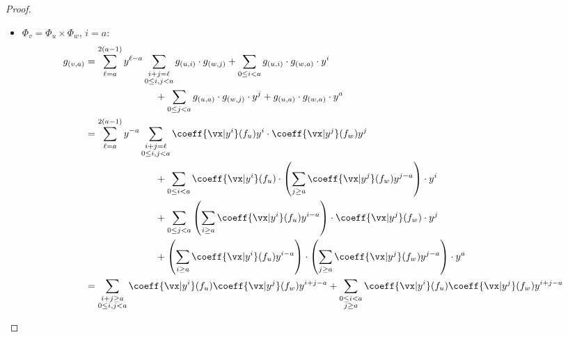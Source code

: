 \documentclass{toc}
\begin{document}
\begin{proof}
\begin{subproof}
\begin{itemize}
\begin{align*}
                                        &=\sum_{0\le j\le i} \coeff{\vx|y^{j}}(f_u) \cdot \coeff{\vx|y^{i-j}}(f_w)\\
                                        &=\coeff{\vx|y^i}(f_u\cdot f_w)
                                        =\coeff{\vx|y^i}(f_v)
                                        \;.
                                \end{align*}
                        \item $\Phi_v=\Phi_u\times\Phi_w$, $i=a$:
                                \begin{align*}
                                        g_{(v,a)}
                                        &=\sum_{\ell=a}^{2(a-1)}y^{\ell-a}\sum_{\substack{i+j=\ell\\0\le i,j< a}}g_{(u,i)}\cdot g_{(w,j)}
                                                + \sum_{0\le i<a} g_{(u,i)}\cdot g_{(w,a)}\cdot y^i\\
                                        &\hspace{1in}+ \sum_{0\le j<a} g_{(u,a)}\cdot g_{(w,j)}\cdot y^j
                                                +g_{(u,a)}\cdot g_{(w,a)}\cdot y^a\\
                                        &=\sum_{\ell=a}^{2(a-1)}y^{-a}\sum_{\substack{i+j=\ell\\0\le i,j< a}}\coeff{\vx|y^i}(f_u)y^i\cdot \coeff{\vx|y^j}(f_w)y^j\\
                                        &\hspace{1in}+ \sum_{0\le i<a} \coeff{\vx|y^i}(f_u)\cdot \left (\sum_{j\ge a}\coeff{\vx|y^j}(f_w)y^{j-a}\right)\cdot y^i\\
                                        &\hspace{1in}+ \sum_{0\le j<a} \left(\sum_{i\ge a}\coeff{\vx|y^i}(f_u)y^{i-a}\right)\cdot \coeff{\vx|y^j}(f_w)\cdot y^j\\
                                        &\hspace{1in}+\left(\sum_{i\ge a}\coeff{\vx|y^i}(f_u)y^{i-a}\right)\cdot \left (\sum_{j\ge a}\coeff{\vx|y^j}(f_w)y^{j-a}\right)\cdot y^a\\
                                        &=\sum_{\substack{i+j\ge a\\0\le i,j<a}}\coeff{\vx|y^i}(f_u)\coeff{\vx|y^j}(f_w) y^{i+j-a}
                                                +\sum_{\substack{0\le i<a\\ j\ge a}}\coeff{\vx|y^i}(f_u)\coeff{\vx|y^j}(f_w) y^{i+j-a}\\

\end{align*}
\end{itemize}
\end{subproof}
\end{proof}
\end{document}
